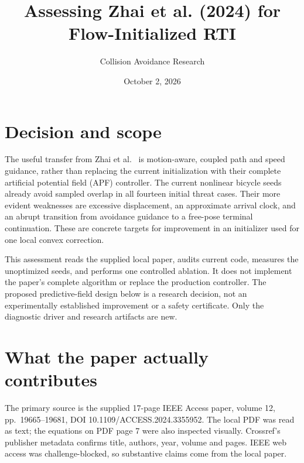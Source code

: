 \documentclass[10pt]{article}
\title{Assessing Zhai et al. (2024) for Flow-Initialized RTI}
\author{Collision Avoidance Research}
\date{October 2, 2026}
\begin{document}
\maketitle

\section{Decision and scope}
The useful transfer from Zhai et al.~\cite{zhai} is motion-aware, coupled
path and speed guidance, rather than replacing the current initialization
with their complete artificial potential field (APF) controller.
The current nonlinear bicycle seeds already avoid sampled overlap in all
fourteen initial threat cases. Their more evident weaknesses are excessive
displacement, an approximate arrival clock, and an abrupt transition from
avoidance guidance to a free-pose terminal continuation.
These are concrete targets for improvement in an initializer used for one
local convex correction.

This assessment reads the supplied local paper, audits current code, measures
the unoptimized seeds, and performs one controlled ablation. It does not
implement the paper's complete algorithm or replace the production controller.
The proposed predictive-field design below is a research decision, not an
experimentally established improvement or a safety certificate.
Only the diagnostic driver and research artifacts are new.

\section{What the paper actually contributes}
The primary source is the supplied 17-page IEEE Access paper, volume 12,
pp.\ 19665--19681, DOI 10.1109/ACCESS.2024.3355952. The local PDF was read as text;
the equations on PDF page 7 were also inspected visually. Crossref's publisher
metadata confirms title, authors, year, volume and pages. IEEE web access was
challenge-blocked, so substantive claims come from the local paper.
\end{document}
